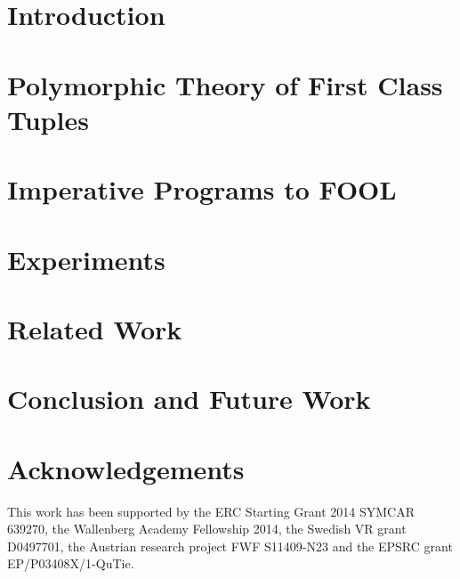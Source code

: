 



\section{Introduction}
\label{sec:boogie/introduction}


\section{Polymorphic Theory of First Class Tuples}
\label{sec:boogie/tuples}


\section{Imperative Programs to FOOL}
\label{sec:boogie/technique}


\section{Experiments}
\label{sec:boogie/experiments}


\section{Related Work}
\label{sec:boogie/related}


\section{Conclusion and Future Work}
\label{sec:boogie/conclusions}


\section*{Acknowledgements}
This work has been supported by the ERC Starting Grant 2014 SYMCAR 639270, the Wallenberg Academy Fellowship 2014, the Swedish VR grant D0497701, the Austrian research project FWF S11409-N23 and the EPSRC grant EP/P03408X/1-QuTie.
